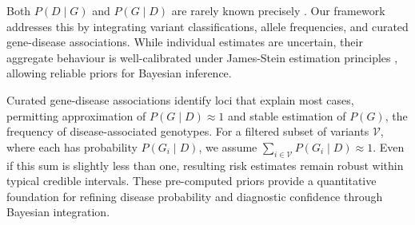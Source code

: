 Both \(P(D\mid G)\) and \(P(G\mid D)\) are rarely known precisely \cite{minikel_quantifying_2016, whiffin_using_2017}. Our framework addresses this by integrating variant classifications, allele frequencies, and curated gene-disease associations. While individual estimates are uncertain, their aggregate behaviour is well-calibrated under James-Stein estimation principles \cite{efron_steins_1973}, allowing reliable priors for Bayesian inference.

Curated gene-disease associations identify loci that explain most cases, permitting approximation of \(P(G\mid D)\approx1\) and stable estimation of \(P(G)\), the frequency of disease-associated genotypes. For a filtered subset of variants \(\mathcal{V}\), where each has probability \(P(G_i\mid D)\), we assume
\(
\sum_{i\in\mathcal{V}} P(G_i\mid D)\approx1.
\)
Even if this sum is slightly less than one, resulting risk estimates remain robust within typical credible intervals. These pre-computed priors provide a quantitative foundation for refining disease probability and diagnostic confidence through Bayesian integration.


